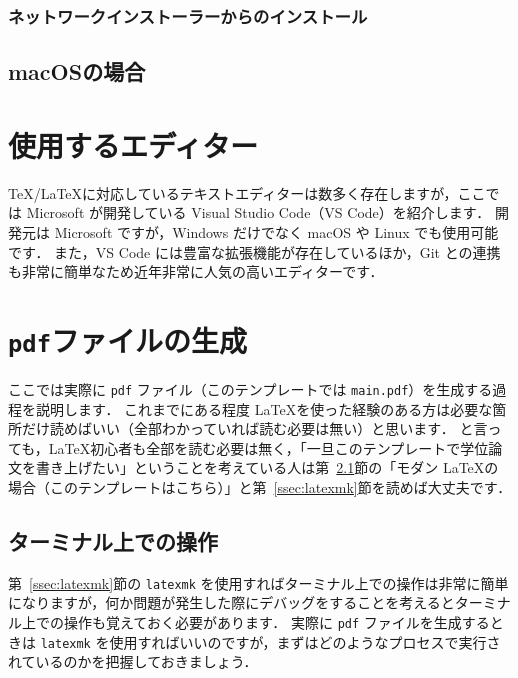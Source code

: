 \subsubsection*{ネットワークインストーラーからのインストール}


\subsection{macOSの場合}
\label{ssec:mac}



\section{使用するエディター}
\label{sec:editor}

\TeX/\LaTeX に対応しているテキストエディターは数多く存在しますが，ここでは Microsoft が開発している Visual Studio Code（VS Code）を紹介します．
開発元は Microsoft ですが，Windows だけでなく macOS や Linux でも使用可能です．
また，VS Code には豊富な拡張機能が存在しているほか，Git との連携も非常に簡単なため近年非常に人気の高いエディターです．

\section{\texttt{pdf}ファイルの生成}
\label{sec:makepdf}

ここでは実際に \verb|pdf| ファイル（このテンプレートでは \verb|main.pdf|）を生成する過程を説明します．
これまでにある程度 \LaTeX を使った経験のある方は必要な箇所だけ読めばいい（全部わかっていれば読む必要は無い）と思います．
と言っても，\LaTeX 初心者も全部を読む必要は無く，「一旦このテンプレートで学位論文を書き上げたい」ということを考えている人は第~\ref{ssec:terminal}節の「モダン \LaTeX の場合（このテンプレートはこちら）」と第~\ref{ssec:latexmk}節を読めば大丈夫です．

\subsection{ターミナル上での操作}
\label{ssec:terminal}

第~\ref{ssec:latexmk}節の \verb|latexmk| を使用すればターミナル上での操作は非常に簡単になりますが，何か問題が発生した際にデバッグをすることを考えるとターミナル上での操作も覚えておく必要があります．
実際に \verb|pdf| ファイルを生成するときは \verb|latexmk| を使用すればいいのですが，まずはどのようなプロセスで実行されているのかを把握しておきましょう．

